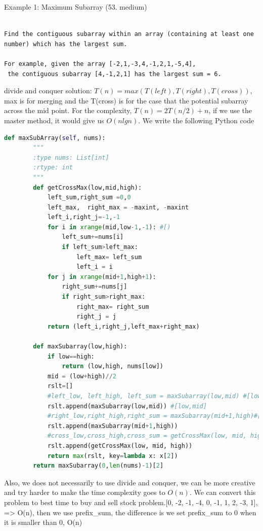 \documentclass[../algorithms.tex]{subfiles}
\begin{document}
 Example 1: Maximum Subarray (53. medium)
\begin{lstlisting}

Find the contiguous subarray within an array (containing at least one number) which has the largest sum.

For example, given the array [-2,1,-3,4,-1,2,1,-5,4],
 the contiguous subarray [4,-1,2,1] has the largest sum = 6.
\end{lstlisting}
divide and conquer solution: $T(n) = max(T(left),T(right), T(cross))$, max is for merging and the T(cross) is for the case that the potential subarray across the mid point. For the complexity, $T(n)=2T(n/2)+n$, if we use the master method, it would give us $O(nlgn)$. We write the following Python code
\begin{lstlisting}[language = Python]
def maxSubArray(self, nums):
        """
        :type nums: List[int]
        :rtype: int
        """
        def getCrossMax(low,mid,high):
            left_sum,right_sum =0,0
            left_max,  right_max = -maxint, -maxint
            left_i,right_j=-1,-1
            for i in xrange(mid,low-1,-1): #[)
                left_sum+=nums[i]
                if left_sum>left_max:
                    left_max= left_sum
                    left_i = i
            for j in xrange(mid+1,high+1):
                right_sum+=nums[j]
                if right_sum>right_max:
                    right_max= right_sum
                    right_j = j
            return (left_i,right_j,left_max+right_max)
        
        def maxSubarray(low,high):
            if low==high:
                return (low,high, nums[low])
            mid = (low+high)//2
            rslt=[]
            #left_low, left_high, left_sum = maxSubarray(low,mid) #[low,mid]
            rslt.append(maxSubarray(low,mid)) #[low,mid]
            #right_low,right_high,right_sum = maxSubarray(mid+1,high)#[mid+1,high]
            rslt.append(maxSubarray(mid+1,high))
            #cross_low,cross_high,cross_sum = getCrossMax(low, mid, high)
            rslt.append(getCrossMax(low, mid, high))
            return max(rslt, key=lambda x: x[2])
        return maxSubarray(0,len(nums)-1)[2]
\end{lstlisting}
Also, we does not necessarily to use divide and conquer, we can be more creative and try harder to make the time complexity goes to $O(n)$. We can convert this problem to best time to buy and sell stock problem.[0, -2, -1, -4, 0, -1, 1, 2, -3, 1], => O(n), then we use prefix\_sum, the difference is we set prefix\_sum to 0 when it is smaller than 0, O(n)
\end{document}
